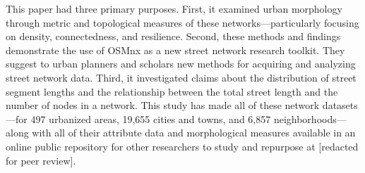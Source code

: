 \documentclass{article}
\begin{document}
This paper had three primary purposes. First, it examined urban morphology through metric and topological measures of these networks---particularly focusing on density, connectedness, and resilience. Second, these methods and findings demonstrate the use of OSMnx as a new street network research toolkit. They suggest to urban planners and scholars new methods for acquiring and analyzing street network data. Third, it investigated claims about the distribution of street segment lengths and the relationship between the total street length and the number of nodes in a network. This study has made all of these network datasets---for 497 urbanized areas, 19,655 cities and towns, and 6,857 neighborhoods---along with all of their attribute data and morphological measures available in an online public repository for other researchers to study and repurpose at [redacted for peer review].




\end{document}
